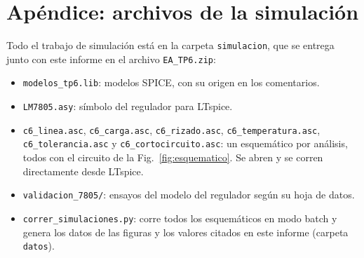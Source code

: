 \section*{Apéndice: archivos de la simulación}
Todo el trabajo de simulación está en la carpeta \texttt{simulacion}, que se entrega junto con este informe en el archivo \texttt{EA\_TP6.zip}:
\begin{itemize}
    \item \texttt{modelos\_tp6.lib}: modelos SPICE, con su origen en los comentarios.
    \item \texttt{LM7805.asy}: símbolo del regulador para LTspice.
    \item \texttt{c6\_linea.asc}, \texttt{c6\_carga.asc}, \texttt{c6\_rizado.asc}, \texttt{c6\_temperatura.asc}, \texttt{c6\_tolerancia.asc} y \texttt{c6\_cortocircuito.asc}: un esquemático por análisis, todos con el circuito de la Fig.~\ref{fig:esquematico}. Se abren y se corren directamente desde LTspice.
    \item \texttt{validacion\_7805/}: ensayos del modelo del regulador según su hoja de datos.
    \item \texttt{correr\_simulaciones.py}: corre todos los esquemáticos en modo batch y genera los datos de las figuras y los valores citados en este informe (carpeta \texttt{datos}).
\end{itemize}
